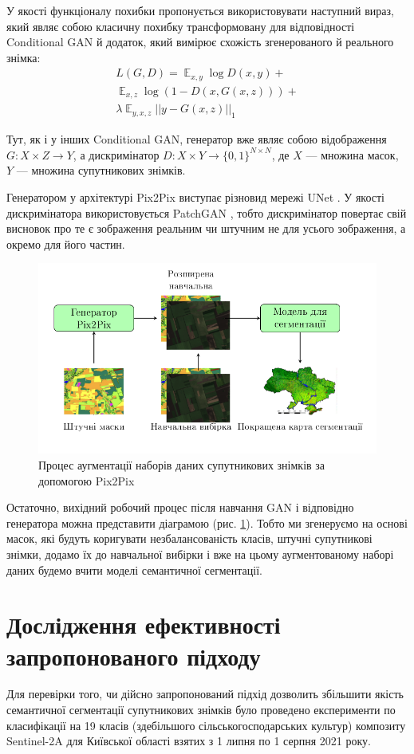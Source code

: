 \documentclass{ConfFTI}
\DeclareMathOperator{\E}{\mathbb{E}}
\begin{document}
У якості функціоналу похибки пропонується використовувати наступний вираз, який являє собою
класичну похибку трансформовану для відповідності Conditional GAN й додаток, який
вимірює схожість згенерованого й реального знімка:
\begin{multline*}
	L(G, D) = \E_{x, y} \log D(x,y) + \\
	\E_{x, z} \log (1 - D(x, G(x, z))) + \\
	\lambda \E_{y, x, z} ||y - G(x, z)||_1
\end{multline*}

Тут, як і у інших Conditional GAN, генератор вже являє собою відображення
$G: X \times Z \rightarrow Y$, а дискримінатор $D: X \times Y \rightarrow \{0, 1\}^{N \times N}$,
де $X$ --- множина масок, $Y$ --- множина супутникових знімків.

Генератором у архітектурі Pix2Pix виступає різновид
мережі UNet \cite{unet}. У якості дискримінатора використовується PatchGAN \cite{pix2pix}, тобто
дискримінатор повертає свій висновок про те є зображення реальним чи штучним не для
усього зображення, а окремо для його частин.

\begin{figure}[ht]
	\centering
	\includegraphics[width=0.49 \textwidth]{pipline.png}
	\caption{Процес аугментації наборів даних супутникових знімків за допомогою Pix2Pix}
	\label{fig:pipline}
\end{figure}

Остаточно, вихідний робочий процес після навчання GAN і відповідно генератора
можна представити діаграмою (рис. \ref{fig:pipline}). Тобто ми згенеруємо на основі масок, які будуть
коригувати незбалансованість класів, штучні супутникові знімки,
додамо їх до навчальної вибірки і вже на цьому аугментованому
наборі даних будемо вчити моделі семантичної сегментації.

\section{Дослідження ефективності запропонованого підходу}

Для перевірки того, чи дійсно запропонований підхід
дозволить збільшити якість семантичної сегментації супутникових знімків
було проведено експерименти по класифікації на 19 класів
(здебільшого сільськогосподарських культур) композиту Sentinel-2A \cite{drusch2012sentinel}
для Київської області взятих з 1 липня по 1 серпня 2021 року.
\end{document}
